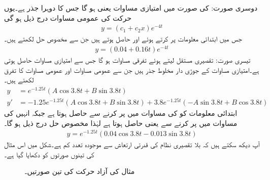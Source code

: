 دوسری صورت:  کی صورت میں امتیازی مساوات  یعنی  ہو گا جس کا دوہرا جذر  ہے۔یوں حرکت کی عمومی مساوات درج ذیل ہو گی
\begin{align*}
y=(c_1+c_2 x)e^{-4t}
\end{align*}  
جس میں ابتدائی معلومات پر کرتے ہوئے  اور  حاصل ہوتے ہیں جن سے مخصوص حل لکھتے ہیں۔
\begin{align*}
y=(0.04+0.16t)e^{-4t}
\end{align*}
تیسری صورت: تقصیری مستقل  لیتے ہوئے  تفرقی مساوات  ہو گا جس سے امتیازی مساوات  حاصل ہوتی ہے۔امتیازی مساوات کے جوڑی دار مخلوط جذر  ہیں جن سے عمومی مساوات اور عمومی مساوات کا تفرق لکھتے ہیں۔
\begin{align*}
y&=e^{-1.25t}\left(A\cos 3.8t+B\sin 3.8t\right)\\
y'&=-1.25e^{-1.25t}\left(A\cos 3.8t+B\sin 3.8t\right)+3.8e^{-1.25t}\left(-A\sin 3.8t+B\cos 3.8t\right)
\end{align*}
ابتدائی معلومات کو  کی مساوات میں پر کرنے  سے  حاصل ہوتا ہے جبکہ انہیں  کی مساوات میں پر کرنے سے  یعنی  حاصل ہوتا ہے لہٰذا مخصوص حل درج ذیل ہو گا۔
\begin{align*}
y=e^{-1.25t} \left(0.04\cos 3.8t-0.013\sin 3.8t\right)
\end{align*}
آپ دیکھ سکتے ہیں کہ بلا تقصیری نظام کی قدرتی ارتعاش  سے موجودہ تعدد  کم ہے۔شکل  میں اس مثال کی تینوں صورتوں کو دکھایا گیا ہے۔
%
\begin{figure}
\centering
{}
\caption{مثال  کی آزاد حرکت کی تین صورتیں۔}
\label{شکل_سادہ_دو_درجی_آزاد_حرکت}
\end{figure}


